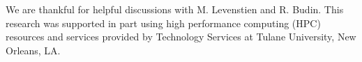 \documentclass[aps,pra,twocolumn,showpacs,superscriptaddress,floatfix,10pt]{revtex4}
\begin{document}
\acknowledgments
We are thankful for helpful discussions with M. Levenstien and R. Budin. This research was supported in part using high performance computing (HPC) resources and services provided by Technology Services at Tulane University, New Orleans, LA.
\end{document}
